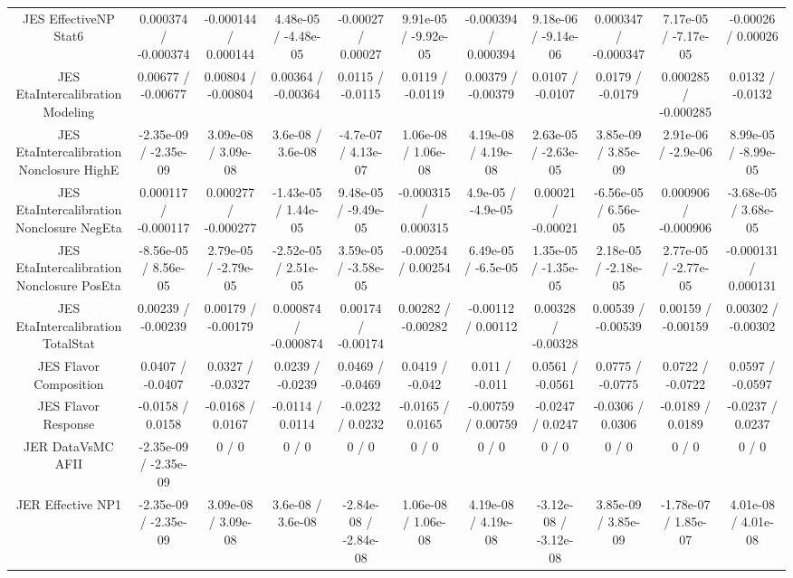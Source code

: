 \begin{table}[htbp]
\begin{center}
\begin{tabular}{|c|c|c|c|c|c|c|c|c|c|c|}
  JES EffectiveNP Stat6 & 0.000374 / -0.000374 & -0.000144 / 0.000144 & 4.48e-05 / -4.48e-05 & -0.00027 / 0.00027 & 9.91e-05 / -9.92e-05 & -0.000394 / 0.000394 & 9.18e-06 / -9.14e-06 & 0.000347 / -0.000347 & 7.17e-05 / -7.17e-05 & -0.00026 / 0.00026 \\ 
  JES EtaIntercalibration Modeling & 0.00677 / -0.00677 & 0.00804 / -0.00804 & 0.00364 / -0.00364 & 0.0115 / -0.0115 & 0.0119 / -0.0119 & 0.00379 / -0.00379 & 0.0107 / -0.0107 & 0.0179 / -0.0179 & 0.000285 / -0.000285 & 0.0132 / -0.0132 \\ 
  JES EtaIntercalibration Nonclosure HighE & -2.35e-09 / -2.35e-09 & 3.09e-08 / 3.09e-08 & 3.6e-08 / 3.6e-08 & -4.7e-07 / 4.13e-07 & 1.06e-08 / 1.06e-08 & 4.19e-08 / 4.19e-08 & 2.63e-05 / -2.63e-05 & 3.85e-09 / 3.85e-09 & 2.91e-06 / -2.9e-06 & 8.99e-05 / -8.99e-05 \\ 
  JES EtaIntercalibration Nonclosure NegEta & 0.000117 / -0.000117 & 0.000277 / -0.000277 & -1.43e-05 / 1.44e-05 & 9.48e-05 / -9.49e-05 & -0.000315 / 0.000315 & 4.9e-05 / -4.9e-05 & 0.00021 / -0.00021 & -6.56e-05 / 6.56e-05 & 0.000906 / -0.000906 & -3.68e-05 / 3.68e-05 \\ 
  JES EtaIntercalibration Nonclosure PosEta & -8.56e-05 / 8.56e-05 & 2.79e-05 / -2.79e-05 & -2.52e-05 / 2.51e-05 & 3.59e-05 / -3.58e-05 & -0.00254 / 0.00254 & 6.49e-05 / -6.5e-05 & 1.35e-05 / -1.35e-05 & 2.18e-05 / -2.18e-05 & 2.77e-05 / -2.77e-05 & -0.000131 / 0.000131 \\ 
  JES EtaIntercalibration TotalStat & 0.00239 / -0.00239 & 0.00179 / -0.00179 & 0.000874 / -0.000874 & 0.00174 / -0.00174 & 0.00282 / -0.00282 & -0.00112 / 0.00112 & 0.00328 / -0.00328 & 0.00539 / -0.00539 & 0.00159 / -0.00159 & 0.00302 / -0.00302 \\ 
  JES Flavor Composition & 0.0407 / -0.0407 & 0.0327 / -0.0327 & 0.0239 / -0.0239 & 0.0469 / -0.0469 & 0.0419 / -0.042 & 0.011 / -0.011 & 0.0561 / -0.0561 & 0.0775 / -0.0775 & 0.0722 / -0.0722 & 0.0597 / -0.0597 \\ 
  JES Flavor Response & -0.0158 / 0.0158 & -0.0168 / 0.0167 & -0.0114 / 0.0114 & -0.0232 / 0.0232 & -0.0165 / 0.0165 & -0.00759 / 0.00759 & -0.0247 / 0.0247 & -0.0306 / 0.0306 & -0.0189 / 0.0189 & -0.0237 / 0.0237 \\ 
  JER DataVsMC AFII & -2.35e-09 / -2.35e-09 & 0 / 0 & 0 / 0 & 0 / 0 & 0 / 0 & 0 / 0 & 0 / 0 & 0 / 0 & 0 / 0 & 0 / 0 \\ 
  JER Effective NP1 & -2.35e-09 / -2.35e-09 & 3.09e-08 / 3.09e-08 & 3.6e-08 / 3.6e-08 & -2.84e-08 / -2.84e-08 & 1.06e-08 / 1.06e-08 & 4.19e-08 / 4.19e-08 & -3.12e-08 / -3.12e-08 & 3.85e-09 / 3.85e-09 & -1.78e-07 / 1.85e-07 & 4.01e-08 / 4.01e-08 \\ 

\end{tabular}
\end{center}
\end{table}
